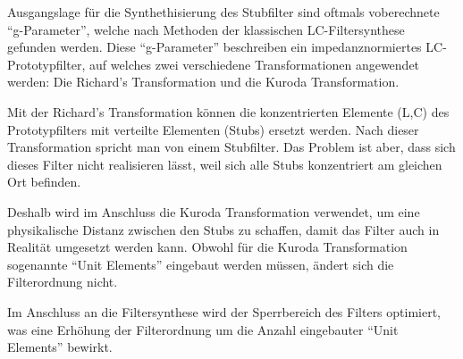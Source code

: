 Ausgangslage  für  die  Synthethisierung  des  Stubfilter  sind oftmals voberechnete
``g-Parameter'',  welche  nach  Methoden  der   klassischen  LC-Filtersynthese
gefunden  werden.  Diese  ``g-Parameter'' beschreiben  ein  impedanznormiertes
LC-Prototypfilter, auf    welches    zwei    verschiedene   Transformationen
angewendet werden: Die Richard's Transformation und die Kuroda Transformation.

Mit der Richard's Transformation können  die konzentrierten Elemente (L,C) des
Prototypfilters mit verteilte  Elementen  (Stubs)  ersetzt werden. Nach dieser
Transformation  spricht  man  von einem Stubfilter. Das Problem ist aber, dass
sich dieses Filter nicht realisieren lässt,  weil sich alle Stubs konzentriert
am gleichen Ort befinden.

Deshalb  wird  im Anschluss  die  Kuroda  Transformation  verwendet,  um  eine
physikalische Distanz zwischen den Stubs zu schaffen, damit das Filter auch in
Realit\"at  umgesetzt  werden  kann.  Obwohl  für  die  Kuroda  Transformation
sogenannte  ``Unit  Elements''  eingebaut  werden   müssen,  ändert  sich  die
Filterordnung nicht.

Im  Anschluss  an   die  Filtersynthese  wird  der  Sperrbereich  des  Filters
optimiert,  was  eine  Erhöhung  der Filterordnung um die  Anzahl  eingebauter
``Unit  Elements'' bewirkt.






